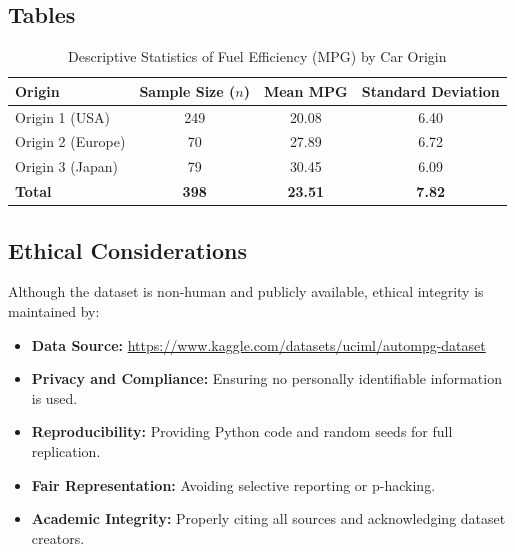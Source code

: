 \documentclass[12pt]{article}
\begin{document}
\subsection{Tables}

\begin{table}[h!]
\centering
\caption{Descriptive Statistics of Fuel Efficiency (MPG) by Car Origin}
\label{tab:descriptive_stats}
\begin{tabular}{lccc}
\toprule
\textbf{Origin} & \textbf{Sample Size ($n$)} & \textbf{Mean MPG} & \textbf{Standard Deviation} \\
\midrule
Origin 1 (USA) & 249 & 20.08 & 6.40 \\
Origin 2 (Europe) & 70 & 27.89 & 6.72 \\
Origin 3 (Japan) & 79 & 30.45 & 6.09 \\
\midrule
\textbf{Total} & \textbf{398} & \textbf{23.51} & \textbf{7.82} \\
\bottomrule
\end{tabular}
\end{table}

\subsection{Ethical Considerations}

Although the dataset is non-human and publicly available, ethical integrity is maintained by:

\begin{itemize}
    \item \textbf{Data Source:} \url{https://www.kaggle.com/datasets/uciml/autompg-dataset}
    \item \textbf{Privacy and Compliance:} Ensuring no personally identifiable information is used.
    \item \textbf{Reproducibility:} Providing Python code and random seeds for full replication.
    \item \textbf{Fair Representation:} Avoiding selective reporting or p-hacking.
    \item \textbf{Academic Integrity:} Properly citing all sources and acknowledging dataset creators.
\end{itemize}
\end{document}
